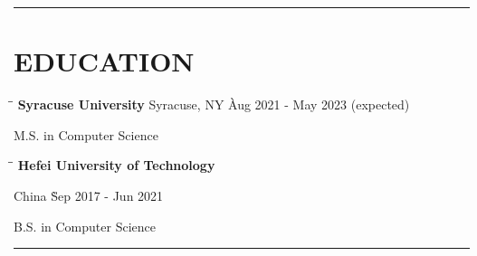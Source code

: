 \documentclass{res}
\begin{document}
 


\address{
    Syracuse, NY $|$
    (315)-965-6606 $|$
    \href{mailto:wangtzuhsiang@gmail.com}{wangtzuhsiang@gmail.com} $|$ 
    \href{https://www.linkedin.com/in/zixiangwang/}{LinkedIn} $|$ 
    \href{https://github.com/DolorHunter}{GitHub}
}

\begin{resume}
\vspace{-15pt}
\hspace{-0.55in}
\noindent\rule[0.25\baselineskip]{19.36cm}{1.2pt}    
\vspace{-20pt}  

\vspace{-0.1in}
\section{EDUCATION} 
    \vspace{0.00in}	 
    \begin{tabbing}
    \hspace{3.49in}\= \hspace{2in}\= \kill %
    {\bf Syracuse University} 
        \>Syracuse, NY \` Aug 2021 - May 2023 (expected)
    \end{tabbing}\vspace{-18.5pt}      %
    M.S. in Computer Science      

    \vspace{-0.15in}	 
    \begin{tabbing}
    \hspace{3.7in}\= \hspace{2in}\= \kill %
    {\bf Hefei University of Technology } 
        
        \>China \` Sep 2017 - Jun 2021
    \end{tabbing}\vspace{-18.5pt}      %
    B.S. in Computer Science   

\vspace{-12pt}
\hspace{-0.55in}
\noindent\rule[0.25\baselineskip]{19.36cm}{0.5pt}    
      

\end{resume}
\end{document}
